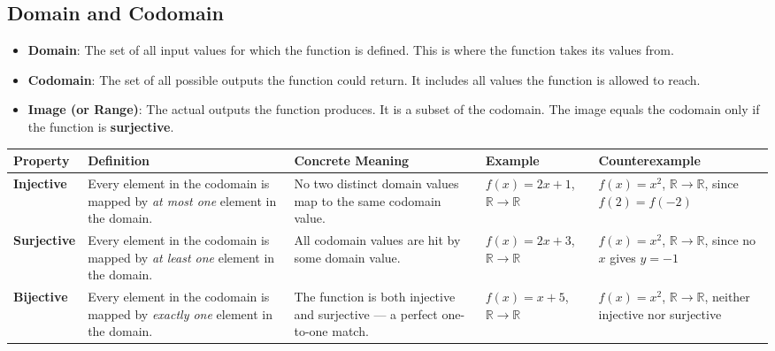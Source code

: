 \documentclass[10pt]{article}
\theoremstyle{plain}
\theoremstyle{definition}
\begin{document}
	\subsection*{Domain and Codomain}
	
	\begin{itemize}
		\item \textbf{Domain}: The set of all input values for which the function is defined. This is where the function takes its values from.
		\item \textbf{Codomain}: The set of all possible outputs the function could return. It includes all values the function is allowed to reach.
		\item \textbf{Image (or Range)}: The actual outputs the function produces. It is a subset of the codomain. The image equals the codomain only if the function is \textbf{surjective}.
	\end{itemize}
	
	\bigskip
	
	\begin{center}
		\begin{tabular}{| >{\raggedright\arraybackslash}m{2.8cm} 
				| >{\raggedright\arraybackslash}m{4.8cm} 
				| >{\raggedright\arraybackslash}m{4.5cm} 
				| >{\raggedright\arraybackslash}m{4.5cm} 
				| >{\raggedright\arraybackslash}m{4.5cm} |}
			\hline
			\textbf{Property} & \textbf{Definition} & \textbf{Concrete Meaning} & \textbf{Example} & \textbf{Counterexample} \\
			\hline
			
			\textbf{Injective} & Every element in the codomain is mapped by \emph{at most one} element in the domain. 
			& No two distinct domain values map to the same codomain value. 
			& \( f(x) = 2x + 1 \), \( \mathbb{R} \to \mathbb{R} \) 
			& \( f(x) = x^2 \), \( \mathbb{R} \to \mathbb{R} \), since \( f(2) = f(-2) \) \\
			
			\hline
			
			\textbf{Surjective} & Every element in the codomain is mapped by \emph{at least one} element in the domain.
			& All codomain values are hit by some domain value. 
			& \( f(x) = 2x + 3 \), \( \mathbb{R} \to \mathbb{R} \) 
			& \( f(x) = x^2 \), \( \mathbb{R} \to \mathbb{R} \), since no \( x \) gives \( y = -1 \) \\
			
			\hline
			
			\textbf{Bijective} & Every element in the codomain is mapped by \emph{exactly one} element in the domain.
			& The function is both injective and surjective — a perfect one-to-one match.
			& \( f(x) = x + 5 \), \( \mathbb{R} \to \mathbb{R} \)
			& \( f(x) = x^2 \), \( \mathbb{R} \to \mathbb{R} \), neither injective nor surjective \\
			
			\hline
		\end{tabular}
	\end{center}
\end{document}
